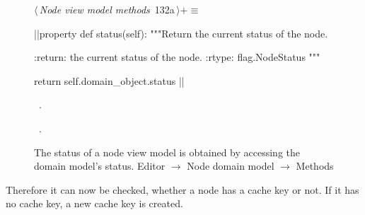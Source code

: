 \documentclass[%
    a4paper,    %
    justified,  %
    nobib,      %
    openany     %
]{tufte-book}
\makeatletter
\renewcommand{\label}[1]{\@tufte@label{##1}}%
\makeatother
\begin{document}
\begin{figure}[!htbp]
\begin{flushleft} \small
\begin{minipage}{\linewidth}\label{scrap76}\raggedright\small
{} $\langle\,${\itshape Node view model methods}\nobreak\ {\footnotesize {132a}}$\,\rangle+\equiv$
\vspace{-1ex}
\begin{pythoncode}
|\normalfont{}\fontfamily{}|property
def status(self):
    """Return the current status of the node.

    :return: the current status of the node.
    :rtype: flag.NodeStatus
    """

    return self.domain_object.status
|\NWsep|
\end{pythoncode}
\vspace{1.5ex}
\footnotesize
\begin{list}{}{\setlength{\itemsep}{-\parsep}\setlength{\itemindent}{-\leftmargin}}
\item \NWtxtMacroDefBy\ .
\item \NWtxtMacroRefIn\ .

\item{}
\end{list}
\end{minipage}\vspace{4ex}
\end{flushleft}
\caption{The status of a node view model is obtained by accessing the domain
  model's status.
  \newline{}\newline{}Editor $\rightarrow$ Node domain model $\rightarrow$
  Methods}
\end{figure}

Therefore it can now be checked, whether a node has a cache key or not. If it
has no cache key, a new cache key is created.
\end{document}
